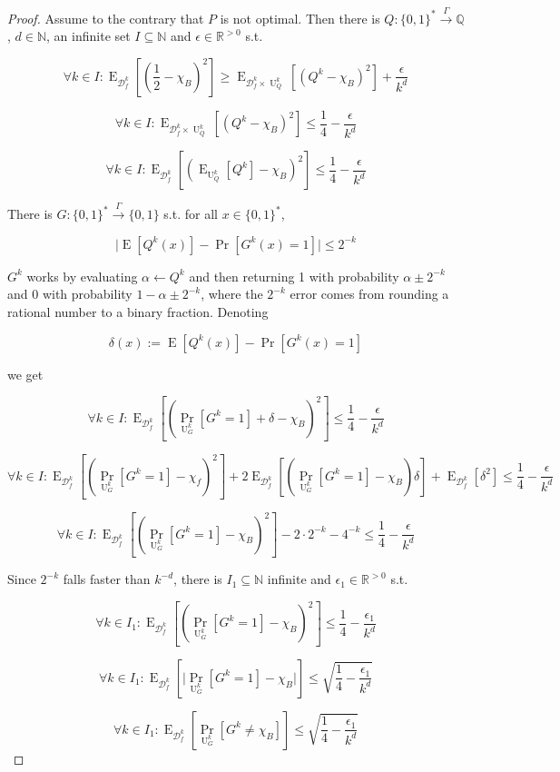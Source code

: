 \documentclass[11pt]{article}
\numberwithin{equation}{section}
\theoremstyle{definition}
\theoremstyle{plain}
\newcommand{\Bool}{\{0,1\}}
\newcommand{\Words}{{\Bool^*}}
\DeclareMathOperator{\Prb}{Pr}
\DeclareMathOperator{\E}{E}
\DeclareMathOperator{\Un}{U}
\newcommand{\Nats}{\mathbb{N}}
\newcommand{\Rats}{\mathbb{Q}}
\newcommand{\Reals}{\mathbb{R}}
\newcommand{\Abs}[1]{\lvert #1 \rvert}
\newcommand{\Dist}{\mathcal{D}}
\newcommand{\Scheme}{\xrightarrow{\Gamma}}
\begin{document}
\begin{proof}

Assume to the contrary that $P$ is not optimal. Then there is ${Q: \Words \Scheme \Rats}$, $d \in \Nats$, an infinite set ${I \subseteq \Nats}$ and $\epsilon \in \Reals^{>0}$ s.t.

$$ \forall k \in I: \E_{\Dist_f^k}[(\frac{1}{2}-\chi_B)^2] \geq \E_{\Dist_f^k \times \Un_Q^k}[(Q^k-\chi_B)^2] +\frac{\epsilon}{k^d}$$

$$ \forall k \in I: \E_{\Dist_f^k \times \Un_Q^{k}}[(Q^{k}-\chi_B)^2] \leq \frac{1}{4} - \frac{\epsilon}{k^d} $$

$$ \forall k \in I: \E_{\Dist_f^k}[(\E_{\Un_Q^{k}}[Q^{k}]-\chi_B)^2] \leq \frac{1}{4} - \frac{\epsilon}{k^d} $$

There is $G: \Words \xrightarrow{\Gamma} \Bool$ s.t. for all ${x \in \Words}$, 

\[\Abs{\E[Q^{k}(x)]-\Pr[G^k(x)=1]}\leq 2^{-k}\] 

$G^k$ works by evaluating ${\alpha \leftarrow Q^{k}}$ and then returning 1 with probability ${\alpha \pm 2^{-k}}$ and 0 with probability $1-\alpha \pm 2^{-k}$, where the $2^{-k}$ error comes from rounding a rational number to a binary fraction. Denoting 

\[\delta(x):=\E[Q^{k}(x)]-\Pr[G^k(x)=1]\]

we get

$$ \forall k \in I: \E_{\Dist_f^k}[(\Prb_{\Un_G^k}[G^k=1]+\delta-\chi_B)^2] \leq \frac{1}{4} - \frac{\epsilon}{k^d} $$

$$ \forall k \in I: \E_{\Dist_f^k}[(\Prb_{\Un_G^k}[G^k=1]-\chi_f)^2]+2 \E_{\Dist_f^k}[(\Prb_{\Un_G^k}[G^k=1]-\chi_B)\delta]+\E_{\Dist_f^k}[\delta^2] \leq \frac{1}{4} - \frac{\epsilon}{k^d}$$

$$ \forall k \in I: \E_{\Dist_f^k}[(\Prb_{\Un_G^k}[G^k=1]-\chi_B)^2]-2 \cdot 2^{-k}- 4^{-k} \leq \frac{1}{4} - \frac{\epsilon}{k^d}$$

Since $2^{-k}$ falls faster than $k^{-d}$, there is $I_1 \subseteq \Nats$ infinite and $\epsilon_1 \in \Reals^{>0}$ s.t.

$$ \forall k \in I_1: \E_{\Dist_f^k}[(\Prb_{\Un_G^k}[G^k=1]-\chi_B)^2] \leq \frac{1}{4} - \frac{\epsilon_1}{k^d}$$

$$ \forall k \in I_1: \E_{\Dist_f^k}[\Abs{\Prb_{\Un_G^k}[G^k=1]-\chi_B}] \leq \sqrt{\frac{1}{4} - \frac{\epsilon_1}{k^d}} $$

$$ \forall k \in I_1: \E_{\Dist_f^k}[\Prb_{\Un_G^k}[G^k \ne \chi_B]] \leq \sqrt{\frac{1}{4} - \frac{\epsilon_1}{k^d}} $$


\end{proof}
\end{document}
